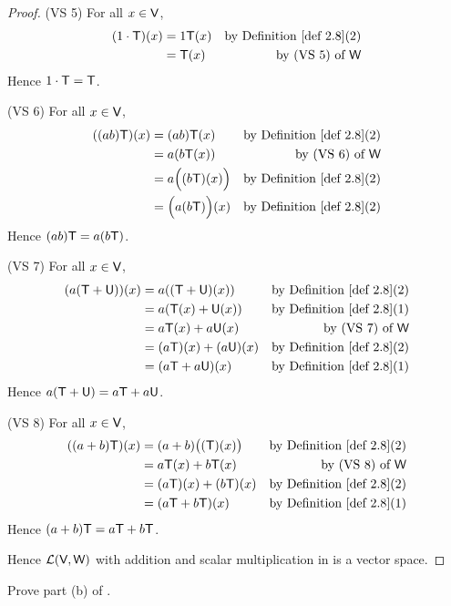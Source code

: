 \begin{proof}
(VS 5) For all \(x \in \textsf{V}\),
\begin{align*}
    (1 \cdot \T)(x) & = 1 \T(x) & \text{by \DEF{2.8}(2)} \\
                    & = \T(x) & \text{by (VS 5) of \(\W\)}
\end{align*}
Hence \(1 \cdot \textsf{T} = \textsf{T}\).

(VS 6) For all \(x \in \textsf{V}\),
\begin{align*}
    ((ab)\T)(x) & = (ab)\T(x) & \text{by \DEF{2.8}(2)} \\
                & = a(b\T(x)) & \text{by (VS 6) of \(\W\)} \\
                & = a\Big( (b\T)(x) \Big) & \text{by \DEF{2.8}(2)} \\
                & = \Big( a(b\T) \Big)(x) & \text{by \DEF{2.8}(2)}
\end{align*}
Hence \((ab)\textsf{T} = a(b\textsf{T})\).

(VS 7) For all \(x \in \textsf{V}\),
\begin{align*}
    (a(\T + \U))(x) & = a((\T + \U)(x)) & \text{by \DEF{2.8}(2)} \\
                    & = a(\T(x) + \U(x)) & \text{by \DEF{2.8}(1)} \\
                    & = a\T(x) + a\U(x) & \text{by (VS 7) of \(\W\)} \\
                    & = (a\T)(x) + (a\U)(x) & \text{by \DEF{2.8}(2)} \\
                    & = (a\T + a\U)(x) & \text{by \DEF{2.8}(1)}
\end{align*}
Hence \(a(\textsf{T} + \textsf{U}) = a\textsf{T} + a\textsf{U}\).

(VS 8) For all \(x \in \textsf{V}\),
\begin{align*}
    ((a + b)\T)(x) & = (a + b)\big( (\T)(x) \big) & \text{by \DEF{2.8}(2)} \\
                    & = a\T(x) + b\T(x) & \text{by (VS 8) of \(\W\)} \\
                    & = (a\T)(x) + (b\T)(x) & \text{by \DEF{2.8}(2)} \\
                    & = (a\T + b\T)(x) & \text{by \DEF{2.8}(1)}
\end{align*}
Hence \((a + b)\textsf{T} = a\textsf{T} + b\textsf{T}\).

Hence \(\mathcal{L}(\textsf{V}, \textsf{W})\) with addition and scalar multiplication in  is a vector space.
\end{proof}

\begin{exercise} \label{exercise 2.2.7}
Prove part (b) of .
\end{exercise}

